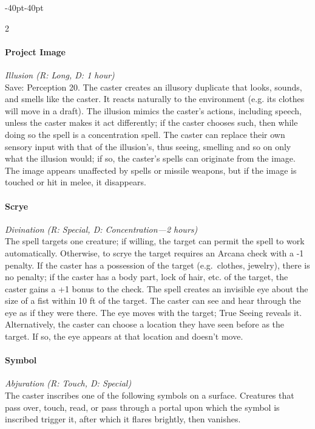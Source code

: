 \documentclass{book}
\begin{document}
\begin{adjustwidth}{-40pt}{-40pt}
\begin{multicols}{2}
\paragraph{Project Image}\label{project-image}

\emph{Illusion (R: Long, D: 1 hour)}\\
Save: Perception 20. The caster creates an illusory duplicate that
looks, sounds, and smells like the caster. It reacts naturally to the
environment (e.g. its clothes will move in a draft). The illusion mimics
the caster's actions, including speech, unless the caster makes it act
differently; if the caster chooses such, then while doing so the spell
is a concentration spell. The caster can replace their own sensory input
with that of the illusion's, thus seeing, smelling and so on only what
the illusion would; if so, the caster's spells can originate from the
image. The image appears unaffected by spells or missile weapons, but if
the image is touched or hit in melee, it disappears.

\paragraph{Scrye}\label{scrye}

\emph{Divination (R: Special, D: Concentration---2 hours)}\\
The spell targets one creature; if willing, the target can permit the
spell to work automatically. Otherwise, to scrye the target requires an
Arcana check with a -1 penalty. If the caster has a possession of the
target (e.g.~clothes, jewelry), there is no penalty; if the caster has a
body part, lock of hair, etc. of the target, the caster gains a +1 bonus
to the check. The spell creates an invisible eye about the size of a
fist within 10 ft of the target. The caster can see and hear through the
eye as if they were there. The eye moves with the target; True Seeing
reveals it. Alternatively, the caster can choose a location they have
seen before as the target. If so, the eye appears at that location and
doesn't move.

\paragraph{Symbol}\label{symbol}

\emph{Abjuration (R: Touch, D: Special)}\\
The caster inscribes one of the following symbols on a surface.
Creatures that pass over, touch, read, or pass through a portal upon
which the symbol is inscribed trigger it, after which it flares
brightly, then vanishes.


\end{multicols}
\end{adjustwidth}
\end{document}
